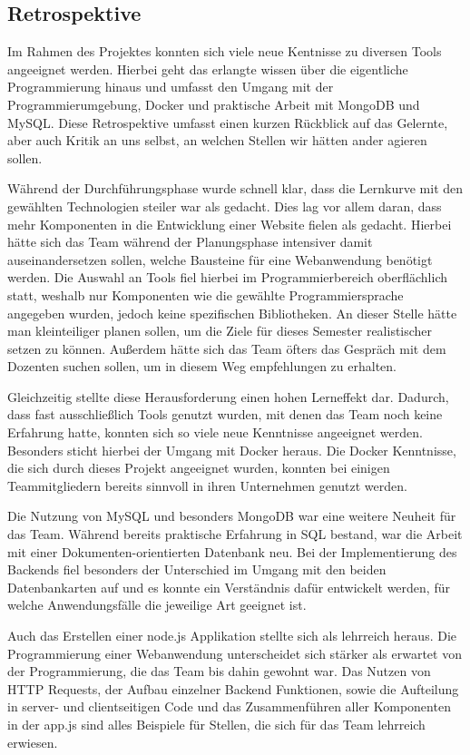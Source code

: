 \subsection{Retrospektive}\label{subsec:retrospektive}

Im Rahmen des Projektes konnten sich viele neue Kentnisse zu diversen Tools angeeignet werden.
Hierbei geht das erlangte wissen über die eigentliche Programmierung hinaus und umfasst den Umgang mit der Programmierumgebung, Docker und praktische Arbeit mit MongoDB und MySQL.
Diese Retrospektive umfasst einen kurzen Rückblick auf das Gelernte, aber auch Kritik an uns selbst, an welchen Stellen wir hätten ander agieren sollen.

Während der Durchführungsphase wurde schnell klar, dass die Lernkurve mit den gewählten Technologien steiler war als gedacht.
Dies lag vor allem daran, dass mehr Komponenten in die Entwicklung einer Website fielen als gedacht.
Hierbei hätte sich das Team während der Planungsphase intensiver damit auseinandersetzen sollen, welche Bausteine für eine Webanwendung benötigt werden.
Die Auswahl an Tools fiel hierbei im Programmierbereich oberflächlich statt, weshalb nur Komponenten wie die gewählte Programmiersprache angegeben wurden, jedoch keine spezifischen Bibliotheken.
An dieser Stelle hätte man kleinteiliger planen sollen, um die Ziele für dieses Semester realistischer setzen zu können.
Außerdem hätte sich das Team öfters das Gespräch mit dem Dozenten suchen sollen, um in diesem Weg empfehlungen zu erhalten.

Gleichzeitig stellte diese Herausforderung einen hohen Lerneffekt dar.
Dadurch, dass fast ausschließlich Tools genutzt wurden, mit denen das Team noch keine Erfahrung hatte, konnten sich so viele neue Kenntnisse angeeignet werden.
Besonders sticht hierbei der Umgang mit Docker heraus.
Die Docker Kenntnisse, die sich durch dieses Projekt angeeignet wurden, konnten bei einigen Teammitgliedern bereits sinnvoll in ihren Unternehmen genutzt werden.

Die Nutzung von MySQL und besonders MongoDB war eine weitere Neuheit für das Team.
Während bereits praktische Erfahrung in SQL bestand, war die Arbeit mit einer Dokumenten-orientierten Datenbank neu.
Bei der Implementierung des Backends fiel besonders der Unterschied im Umgang mit den beiden Datenbankarten auf und es konnte ein Verständnis dafür entwickelt werden, für welche Anwendungsfälle die jeweilige Art geeignet ist.

Auch das Erstellen einer node.js Applikation stellte sich als lehrreich heraus.
Die Programmierung einer Webanwendung unterscheidet sich stärker als erwartet von der Programmierung, die das Team bis dahin gewohnt war.
Das Nutzen von HTTP Requests, der Aufbau einzelner Backend Funktionen, sowie die Aufteilung in server- und clientseitigen Code und das Zusammenführen aller Komponenten in der app.js sind alles Beispiele für Stellen, die sich für das Team lehrreich erwiesen.

